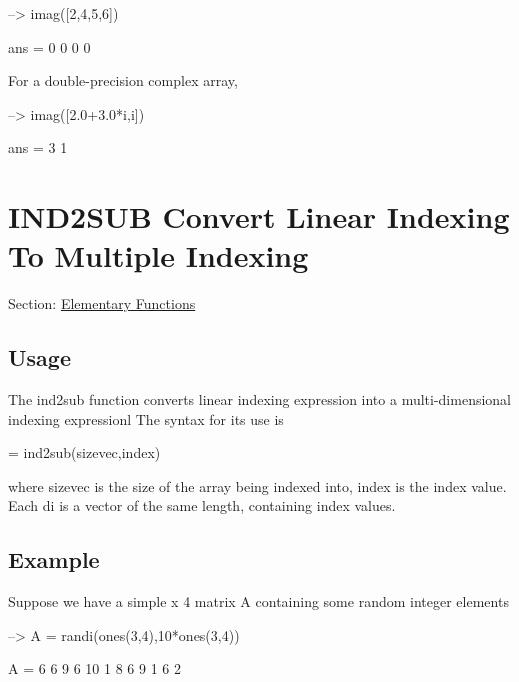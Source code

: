 \begin{DoxyVerbInclude}
--> imag([2,4,5,6])

ans = 
 0 0 0 0 
\end{DoxyVerbInclude}


For a double-\/precision complex array,


\begin{DoxyVerbInclude}
--> imag([2.0+3.0*i,i])

ans = 
 3 1 
\end{DoxyVerbInclude}
 \hypertarget{elementary_ind2sub}{}\section{I\-N\-D2\-S\-U\-B Convert Linear Indexing To Multiple Indexing}\label{elementary_ind2sub}
Section\-: \hyperlink{sec_elementary}{Elementary Functions} \hypertarget{vtkwidgets_vtkxyplotwidget_Usage}{}\subsection{Usage}\label{vtkwidgets_vtkxyplotwidget_Usage}
The {\ttfamily ind2sub} function converts linear indexing expression into a multi-\/dimensional indexing expressionl The syntax for its use is \begin{DoxyVerb}   [d1, d2, ..., dn] = ind2sub(sizevec,index)
\end{DoxyVerb}
 where {\ttfamily sizevec} is the size of the array being indexed into, index is the index value. Each {\ttfamily di} is a vector of the same length, containing index values. \hypertarget{variables_struct_Example}{}\subsection{Example}\label{variables_struct_Example}
Suppose we have a simple { x 4} matrix {\ttfamily A} containing some random integer elements


\begin{DoxyVerbInclude}
--> A = randi(ones(3,4),10*ones(3,4))

A = 
  6  6  9  6 
 10  1  8  6 
  9  1  6  2 
\end{DoxyVerbInclude}



